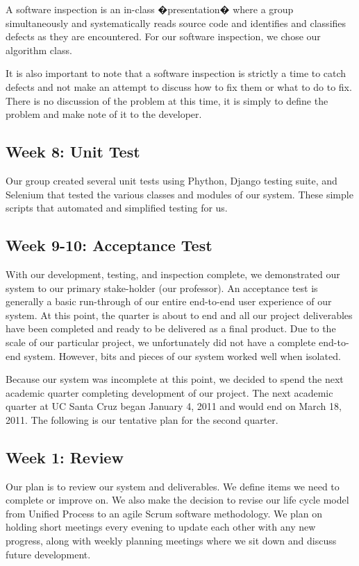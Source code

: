 \documentclass[12pt]{article}
\begin{document}
\begin{enumerate}
A software inspection is an in-class �presentation� where a group simultaneously and systematically reads source code and identifies and classifies defects as they are encountered. For our software inspection, we chose our algorithm class.

It is also important to note that a software inspection is strictly a time to catch defects and not make an attempt to discuss how to fix them or what to do to fix. There is no discussion of the problem at this time, it is simply to define the problem and make note of it to the developer. 

\subsection*{Week 8: Unit Test}

Our group created several unit tests using Phython, Django testing suite, and Selenium that tested the various classes and modules of our system. These simple scripts that automated and simplified testing for us.  
\subsection*{Week 9-10: Acceptance Test}

With our development, testing, and inspection complete, we demonstrated our system to our primary stake-holder (our professor). An acceptance test is generally a basic run-through of our entire end-to-end user experience of our system. 
At this point, the quarter is about to end and all our project deliverables have been completed and ready to be delivered as a final product. Due to the scale of our particular project, we unfortunately did not have a complete end-to-end system. However, bits and pieces of our system worked well when isolated. 

Because our system was incomplete at this point, we decided to spend the next academic quarter completing development of our project. The next academic quarter at UC Santa Cruz began January 4, 2011 and would end on March 18, 2011. The following is our tentative plan for the second quarter. 

\subsection*{Week 1: Review}

Our plan is to review our system and deliverables. We define items we need to complete or improve on. We also make the decision to revise our life cycle model from Unified Process to an agile Scrum software methodology. We plan on holding short meetings every evening to update each other with any new progress, along with weekly planning meetings where we sit down and discuss future development. 


\end{enumerate}
\end{document}
